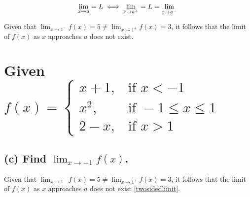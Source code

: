 \documentclass{article}
\begin{document}
\begin{equation}\label{twosidedlimit}
    \lim_{x \to a}=L \iff \lim_{x \to a^{+}}=L=\lim_{x \to a^{-}} \\
\end{equation}

Given that $\lim_{x \to 1^{-}} f(x)=5 \neq \lim_{x \to 1^{+}} f(x)=3$, it follows that the limit of $f(x)$ as $x$
approaches $a$ does not exist.

\section*{Given $ f(x)=
    \begin{cases}
        x + 1, & \text{if } x < -1  \\
        x^{2}, & \text{if } -1 \leq x \leq 1 \\
        2 - x, & \text{if } x > 1
    \end{cases} $}

\subsection*{(c) Find $ \lim_{x \to -1} f(x) $.}

Given that $\lim_{x \to 1^{-}} f(x)=5 \neq \lim_{x \to 1^{+}} f(x)=3$, it follows that the limit of $f(x)$ as $x$
approaches $a$ does not exist \eqref{twosidedlimit}.
\end{document}
